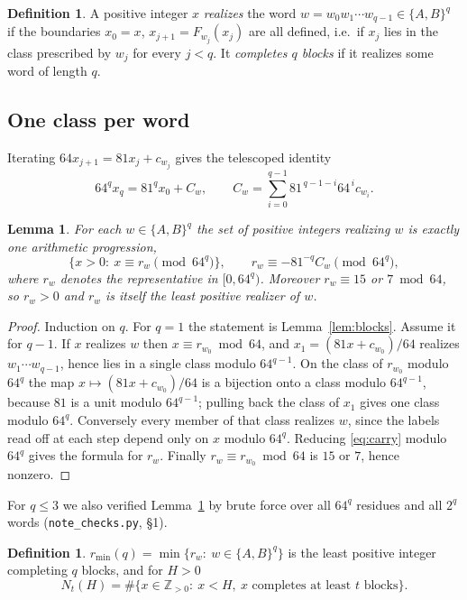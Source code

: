 \documentclass[11pt,a4paper]{article}
\theoremstyle{plain}
\newtheorem{lemma}[theorem]{Lemma}
\theoremstyle{definition}
\newtheorem{definition}[theorem]{Definition}
\theoremstyle{remark}
\newcommand{\Zpos}{\mathbb{Z}_{>0}}
\begin{document}
\begin{definition}
A positive integer $x$ \emph{realizes} the word $w=w_0w_1\cdots w_{q-1}\in\{A,B\}^q$
if the boundaries $x_0=x$, $x_{j+1}=F_{w_j}(x_j)$ are all defined, i.e.\ if
$x_j$ lies in the class prescribed by $w_j$ for every $j<q$. It
\emph{completes $q$ blocks} if it realizes some word of length $q$.
\end{definition}

\subsection{One class per word}

Iterating $64x_{j+1}=81x_j+c_{w_j}$ gives the telescoped identity
\begin{equation}\label{eq:carry}
64^{q}x_q=81^{q}x_0+C_w,\qquad
C_w=\sum_{i=0}^{q-1}81^{\,q-1-i}64^{\,i}c_{w_i}.
\end{equation}

\begin{lemma}\label{lem:class}
For each $w\in\{A,B\}^q$ the set of positive integers realizing $w$ is exactly
one arithmetic progression,
\[
\{x>0:\ x\equiv r_w \pmod{64^{q}}\},\qquad
r_w\equiv -81^{-q}C_w \pmod{64^{q}},
\]
where $r_w$ denotes the representative in $[0,64^q)$. Moreover
$r_w\equiv 15$ or $7 \bmod 64$, so $r_w>0$ and $r_w$ is itself the least
positive realizer of $w$.
\end{lemma}

\begin{proof}
Induction on $q$. For $q=1$ the statement is Lemma~\ref{lem:blocks}. Assume it
for $q-1$. If $x$ realizes $w$ then $x\equiv r_{w_0}\bmod 64$, and
$x_1=(81x+c_{w_0})/64$ realizes $w_1\cdots w_{q-1}$, hence lies in a single
class modulo $64^{q-1}$. On the class of $r_{w_0}$ modulo $64^{q}$ the map
$x\mapsto (81x+c_{w_0})/64$ is a bijection onto a class modulo $64^{q-1}$,
because $81$ is a unit modulo $64^{q-1}$; pulling back the class of
$x_1$ gives one class modulo $64^{q}$. Conversely every member of that class
realizes $w$, since the labels read off at each step depend only on $x$ modulo
$64^{q}$. Reducing \eqref{eq:carry} modulo $64^q$ gives the formula for $r_w$.
Finally $r_w\equiv r_{w_0}\bmod 64$ is $15$ or $7$, hence nonzero.
\end{proof}

For $q\le 3$ we also verified Lemma~\ref{lem:class} by brute force over all
$64^q$ residues and all $2^q$ words (\texttt{note\_checks.py}, \S1).

\begin{definition}
$r_{\min}(q)=\min\{r_w:\ w\in\{A,B\}^q\}$ is the least positive integer
completing $q$ blocks, and for $H>0$
\[
N_t(H)=\#\{x\in\Zpos:\ x<H,\ x \text{ completes at least } t \text{ blocks}\}.
\]
\end{definition}
\end{document}
